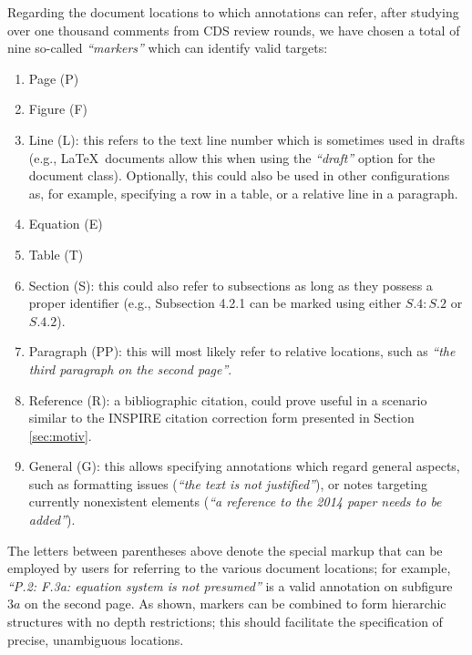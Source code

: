 Regarding the document locations to which annotations can refer, after studying
over one thousand comments from CDS review rounds, we have chosen a total of
nine so-called \textit{``markers''} which can identify valid targets:
\begin{enumerate}
  \item Page (P)
  \item Figure (F)
  \item Line (L): this refers to the text line number which is sometimes used
                  in drafts (e.g., \LaTeX\ documents allow this when using the
                  \textit{``draft''} option for the document class). Optionally,
                  this could also be used in other configurations as, for
                  example, specifying a row in a table, or a relative line in a
                  paragraph.
  \item Equation (E)
  \item Table (T)
  \item Section (S): this could also refer to subsections as long as they
                     possess a proper identifier (e.g., Subsection 4.2.1 can be
                     marked using either $S.4: S.2$ or $S.4.2$).
  \item Paragraph (PP): this will most likely refer to relative locations, such
                        as \textit{``the third paragraph on the second page''}.
  \item Reference (R): a bibliographic citation, could prove useful in a
                       scenario similar to the INSPIRE citation correction 
                       form presented in Section \ref{sec:motiv}.
  \item General (G): this allows specifying annotations which regard general
                     aspects, such as formatting issues (\textit{``the text is
                     not justified''}), or notes targeting currently nonexistent
                     elements (\textit{``a reference to the 2014 paper needs to
                     be added''}).
\end{enumerate}
The letters between parentheses above denote the special markup that can be
employed by users for referring to the various document locations; for example,
\textit{``P.2: F.3a: equation system is not presumed''} is a valid annotation
on subfigure $3a$ on the second page. As shown, markers can be combined to form
hierarchic structures with no depth restrictions; this should facilitate the
specification of precise, unambiguous locations.

